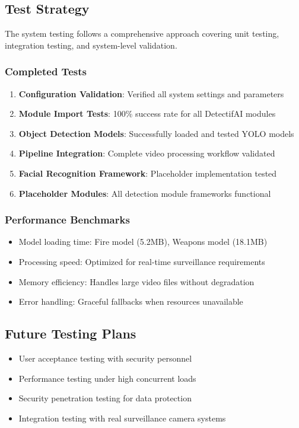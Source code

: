 \documentclass[12pt,a4paper]{article}
\begin{document}
\subsection{Test Strategy}
The system testing follows a comprehensive approach covering unit testing, integration testing, and system-level validation.

\subsubsection{Completed Tests}
\begin{enumerate}
    \item \textbf{Configuration Validation}: Verified all system settings and parameters
    \item \textbf{Module Import Tests}: 100\% success rate for all DetectifAI modules
    \item \textbf{Object Detection Models}: Successfully loaded and tested YOLO models
    \item \textbf{Pipeline Integration}: Complete video processing workflow validated
    \item \textbf{Facial Recognition Framework}: Placeholder implementation tested
    \item \textbf{Placeholder Modules}: All detection module frameworks functional
\end{enumerate}

\subsubsection{Performance Benchmarks}
\begin{itemize}
    \item Model loading time: Fire model (5.2MB), Weapons model (18.1MB)
    \item Processing speed: Optimized for real-time surveillance requirements
    \item Memory efficiency: Handles large video files without degradation
    \item Error handling: Graceful fallbacks when resources unavailable
\end{itemize}

\subsection{Future Testing Plans}
\begin{itemize}
    \item User acceptance testing with security personnel
    \item Performance testing under high concurrent loads
    \item Security penetration testing for data protection
    \item Integration testing with real surveillance camera systems
\end{itemize}
\end{document}
